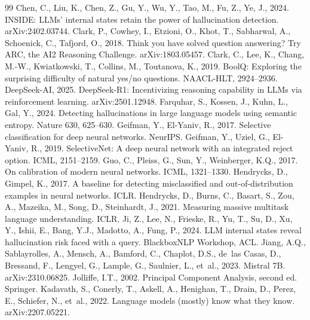 \documentclass[preprint,12pt,authoryear]{elsarticle}
\begin{document}
\begin{thebibliography}{99}
 Chen, C., Liu, K., Chen, Z., Gu, Y., Wu, Y., Tao, M., Fu, Z., Ye, J., 2024. INSIDE: LLMs' internal states retain the power of hallucination detection. arXiv:2402.03744.
 Clark, P., Cowhey, I., Etzioni, O., Khot, T., Sabharwal, A., Schoenick, C., Tafjord, O., 2018. Think you have solved question answering? Try ARC, the AI2 Reasoning Challenge. arXiv:1803.05457.
 Clark, C., Lee, K., Chang, M.-W., Kwiatkowski, T., Collins, M., Toutanova, K., 2019. BoolQ: Exploring the surprising difficulty of natural yes/no questions. NAACL-HLT, 2924--2936.
 DeepSeek-AI, 2025. DeepSeek-R1: Incentivizing reasoning capability in LLMs via reinforcement learning. arXiv:2501.12948.
 Farquhar, S., Kossen, J., Kuhn, L., Gal, Y., 2024. Detecting hallucinations in large language models using semantic entropy. Nature 630, 625--630.
 Geifman, Y., El-Yaniv, R., 2017. Selective classification for deep neural networks. NeurIPS.
 Geifman, Y., Uziel, G., El-Yaniv, R., 2019. SelectiveNet: A deep neural network with an integrated reject option. ICML, 2151--2159.
 Guo, C., Pleiss, G., Sun, Y., Weinberger, K.Q., 2017. On calibration of modern neural networks. ICML, 1321--1330.
 Hendrycks, D., Gimpel, K., 2017. A baseline for detecting misclassified and out-of-distribution examples in neural networks. ICLR.
 Hendrycks, D., Burns, C., Basart, S., Zou, A., Mazeika, M., Song, D., Steinhardt, J., 2021. Measuring massive multitask language understanding. ICLR.
 Ji, Z., Lee, N., Frieske, R., Yu, T., Su, D., Xu, Y., Ishii, E., Bang, Y.J., Madotto, A., Fung, P., 2024. LLM internal states reveal hallucination risk faced with a query. BlackboxNLP Workshop, ACL.
 Jiang, A.Q., Sablayrolles, A., Mensch, A., Bamford, C., Chaplot, D.S., de~las Casas, D., Bressand, F., Lengyel, G., Lample, G., Saulnier, L., et~al., 2023. Mistral 7B. arXiv:2310.06825.
 Jolliffe, I.T., 2002. Principal Component Analysis, second ed. Springer.
 Kadavath, S., Conerly, T., Askell, A., Henighan, T., Drain, D., Perez, E., Schiefer, N., et~al., 2022. Language models (mostly) know what they know. arXiv:2207.05221.

\end{thebibliography}
\end{document}
